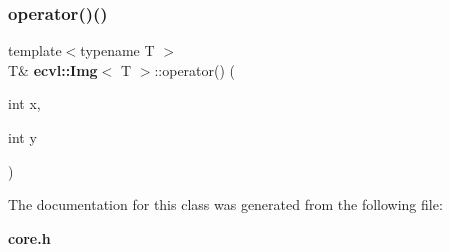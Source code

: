 \subsubsection{operator()()}
{\footnotesize\ttfamily template$<$typename T $>$ \\
T\& \textbf{ ecvl\+::\+Img}$<$ T $>$\+::operator() (\begin{DoxyParamCaption}\item[{int}]{x,  }\item[{int}]{y }\end{DoxyParamCaption})\hspace{0.3cm}{\ttfamily [inline]}}



The documentation for this class was generated from the following file\+:\begin{DoxyCompactItemize}
\item 
\textbf{ core.\+h}\end{DoxyCompactItemize}

